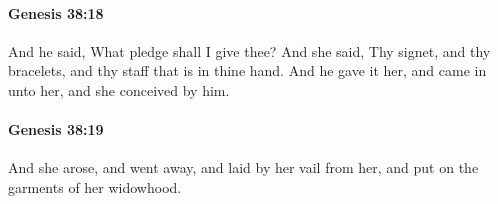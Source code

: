 		\paragraph{Genesis 38:18} %
			\label{GENESIS-38-18}

			And he said, What pledge shall I give thee? And she said, Thy signet, and thy bracelets, and thy staff that is in thine hand. And he gave it her, and came in unto her, and she conceived by him.


		\paragraph{Genesis 38:19} %
			\label{GENESIS-38-19}

			And she arose, and went away, and laid by her vail from her, and put on the garments of her widowhood.


